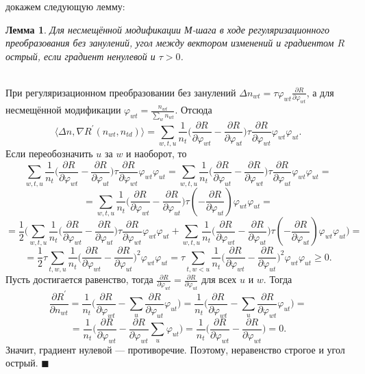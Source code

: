 \documentclass[12pt]{article}
\newtheorem{lemma}[remark]{Лемма}
\newenvironment{Proof} 
	{\par\noindent{\bf Доказательство.}} 
	{\hfill$\blacksquare$}
\renewcommand{\geq}{\geqslant}
\renewcommand{\phi}{\varphi}
\begin{document}
 докажем следующую лемму:
\begin{lemma}           
 Для несмещённой модификации М-шага в ходе регуляризационного преобразования  без занулений, угол  между вектором изменений и градиентом $R$ острый, если градиент ненулевой и $\tau > 0$.
\end{lemma}
\begin{Proof}\\
При регуляризационном преобразовании без занулений $\Delta n_{wt} = \tau \phi_{wt} \frac{\partial{R}}{\partial{\phi_{wt}}}$, а для несмещённой модификации $\phi_{wt} = \frac{n_{wt}}{\sum\limits_w n_{wt}}$. Отсюда
\[
\langle \Delta n, \nabla R^{\prime}(n_{wt}, n_{td})\rangle = \sum\limits_{w, t, u}  \frac{1}{n_{t}}  \bigg(  \frac{\partial{R}}{\partial{\phi_{wt}}}  -  \frac{\partial{R}}{\partial{\phi_{ut}}}  \bigg)  \tau \frac{\partial{R}}{\partial{\phi_{wt}}} \phi_{wt} \phi_{ut}.
\]
Если переобозначить $u$ за $w$ и наоборот, то 
\[
\sum\limits_{w, t, u}  \frac{1}{n_{t}}  \bigg(  \frac{\partial{R}}{\partial{\phi_{wt}}}  -  \frac{\partial{R}}{\partial{\phi_{ut}}}  \bigg)  \tau \frac{\partial{R}}{\partial{\phi_{wt}}} \phi_{wt} \phi_{ut}  = \sum\limits_{w, t, u}  \frac{1}{n_{t}}  \bigg(  \frac{\partial{R}}{\partial{\phi_{ut}}}  -  \frac{\partial{R}}{\partial{\phi_{wt}}}  \bigg)  \tau \frac{\partial{R}}{\partial{\phi_{ut}}} \phi_{wt} \phi_{ut} = 
\]
\[
= \sum\limits_{w, t, u}  \frac{1}{n_{t}}  \bigg(  \frac{\partial{R}}{\partial{\phi_{wt}}}  -  \frac{\partial{R}}{\partial{\phi_{ut}}}  \bigg)  \tau \left(-\frac{\partial{R}}{\partial{\phi_{ut}}}\right) \phi_{wt} \phi_{ut} = 
\]
\[
= \frac12 \bigg(\sum\limits_{w, t, u}  \frac{1}{n_{t}}  \bigg(  \frac{\partial{R}}{\partial{\phi_{wt}}}  -  \frac{\partial{R}}{\partial{\phi_{ut}}}  \bigg)  \tau \frac{\partial{R}}{\partial{\phi_{wt}}} \phi_{wt} \phi_{ut} +  \sum\limits_{w, t, u}  \frac{1}{n_{t}}  \bigg(  \frac{\partial{R}}{\partial{\phi_{wt}}}  -  \frac{\partial{R}}{\partial{\phi_{ut}}}  \bigg)  \tau \left(-\frac{\partial{R}}{\partial{\phi_{ut}}}\right) \phi_{wt} \phi_{ut} \bigg)= 
\]
\[
= \frac12 \tau \sum\limits_{t, w, u}  \frac{1}{n_{t}} \bigg(  \frac{\partial{R}}{\partial{\phi_{wt}}}  -  \frac{\partial{R}}{\partial{\phi_{ut}}}  \bigg)^2 \phi_{wt} \phi_{ut} = \tau \sum\limits_{t, w < u}  \frac{1}{n_{t}} \bigg(  \frac{\partial{R}}{\partial{\phi_{wt}}}  -  \frac{\partial{R}}{\partial{\phi_{ut}}}  \bigg)^2 \phi_{wt} \phi_{ut} \geq 0.
\]
Пусть достигается равенство, тогда $\frac{\partial{R}}{\partial{\phi_{wt}}}  =  \frac{\partial{R}}{\partial{\phi_{ut}}}$ для всех $u$ и $w$. Тогда
\[
\frac{\partial{R^{\prime}}}{\partial{n_{wt}}} = \frac{1}{n_t} \bigg( \frac{\partial{R}}{\partial{\phi_{wt}}} - \sum_{u}  \frac{\partial{R}}{\partial{\phi_{ut}}} \phi_{ut} \bigg) = \frac{1}{n_t} \bigg( \frac{\partial{R}}{\partial{\phi_{wt}}} - \sum_{u}  \frac{\partial{R}}{\partial{\phi_{wt}}} \phi_{ut} \bigg) =
\]
\[
=\frac{1}{n_t} \bigg( \frac{\partial{R}}{\partial{\phi_{wt}}} - \frac{\partial{R}}{\partial{\phi_{wt}}} \sum_{u} \phi_{ut} \bigg)  = \frac{1}{n_t} \bigg( \frac{\partial{R}}{\partial{\phi_{wt}}} - \frac{\partial{R}}{\partial{\phi_{wt}}} \bigg) = 0.
\]
Значит, градиент нулевой --- противоречие. Поэтому, неравенство строгое и угол острый.
\end{Proof}
\end{document}

